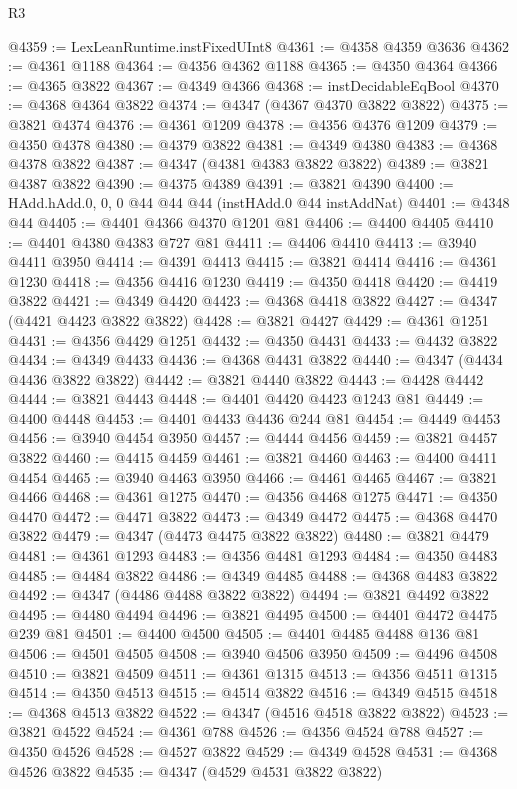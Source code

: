 \begin{lexlean}{R3}
\begin{coremodule}
@4359 := LexLeanRuntime.instFixedUInt8
@4361 := @4358 @4359 @3636
@4362 := @4361 @1188
@4364 := @4356 @4362 @1188
@4365 := @4350 @4364
@4366 := @4365 @3822
@4367 := @4349 @4366
@4368 := instDecidableEqBool
@4370 := @4368 @4364 @3822
@4374 := @4347 (@4367 @4370 @3822 @3822)
@4375 := @3821 @4374
@4376 := @4361 @1209
@4378 := @4356 @4376 @1209
@4379 := @4350 @4378
@4380 := @4379 @3822
@4381 := @4349 @4380
@4383 := @4368 @4378 @3822
@4387 := @4347 (@4381 @4383 @3822 @3822)
@4389 := @3821 @4387 @3822
@4390 := @4375 @4389
@4391 := @3821 @4390
@4400 := HAdd.hAdd.{0, 0, 0} @44 @44 @44 (instHAdd.{0} @44 instAddNat)
@4401 := @4348 @44
@4405 := @4401 @4366 @4370 @1201 @81
@4406 := @4400 @4405
@4410 := @4401 @4380 @4383 @727 @81
@4411 := @4406 @4410
@4413 := @3940 @4411 @3950
@4414 := @4391 @4413
@4415 := @3821 @4414
@4416 := @4361 @1230
@4418 := @4356 @4416 @1230
@4419 := @4350 @4418
@4420 := @4419 @3822
@4421 := @4349 @4420
@4423 := @4368 @4418 @3822
@4427 := @4347 (@4421 @4423 @3822 @3822)
@4428 := @3821 @4427
@4429 := @4361 @1251
@4431 := @4356 @4429 @1251
@4432 := @4350 @4431
@4433 := @4432 @3822
@4434 := @4349 @4433
@4436 := @4368 @4431 @3822
@4440 := @4347 (@4434 @4436 @3822 @3822)
@4442 := @3821 @4440 @3822
@4443 := @4428 @4442
@4444 := @3821 @4443
@4448 := @4401 @4420 @4423 @1243 @81
@4449 := @4400 @4448
@4453 := @4401 @4433 @4436 @244 @81
@4454 := @4449 @4453
@4456 := @3940 @4454 @3950
@4457 := @4444 @4456
@4459 := @3821 @4457 @3822
@4460 := @4415 @4459
@4461 := @3821 @4460
@4463 := @4400 @4411 @4454
@4465 := @3940 @4463 @3950
@4466 := @4461 @4465
@4467 := @3821 @4466
@4468 := @4361 @1275
@4470 := @4356 @4468 @1275
@4471 := @4350 @4470
@4472 := @4471 @3822
@4473 := @4349 @4472
@4475 := @4368 @4470 @3822
@4479 := @4347 (@4473 @4475 @3822 @3822)
@4480 := @3821 @4479
@4481 := @4361 @1293
@4483 := @4356 @4481 @1293
@4484 := @4350 @4483
@4485 := @4484 @3822
@4486 := @4349 @4485
@4488 := @4368 @4483 @3822
@4492 := @4347 (@4486 @4488 @3822 @3822)
@4494 := @3821 @4492 @3822
@4495 := @4480 @4494
@4496 := @3821 @4495
@4500 := @4401 @4472 @4475 @239 @81
@4501 := @4400 @4500
@4505 := @4401 @4485 @4488 @136 @81
@4506 := @4501 @4505
@4508 := @3940 @4506 @3950
@4509 := @4496 @4508
@4510 := @3821 @4509
@4511 := @4361 @1315
@4513 := @4356 @4511 @1315
@4514 := @4350 @4513
@4515 := @4514 @3822
@4516 := @4349 @4515
@4518 := @4368 @4513 @3822
@4522 := @4347 (@4516 @4518 @3822 @3822)
@4523 := @3821 @4522
@4524 := @4361 @788
@4526 := @4356 @4524 @788
@4527 := @4350 @4526
@4528 := @4527 @3822
@4529 := @4349 @4528
@4531 := @4368 @4526 @3822
@4535 := @4347 (@4529 @4531 @3822 @3822)

\end{coremodule}
\end{lexlean}
